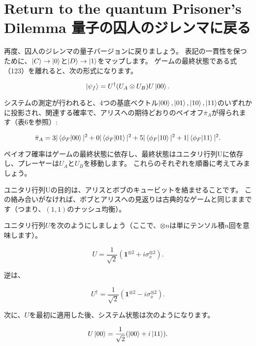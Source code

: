 \section{Return to the quantum Prisoner’s Dilemma 量子の囚人のジレンマに戻る}

再度、囚人のジレンマの量子バージョンに戻りましょう。 表記の一貫性を保つために、$\ket{C} \to \ket{0}$と$\ket{D} \to \ket{1}$をマップします。
ゲームの最終状態である式（123）を離れると、次の形式になります。

\begin{equation}
\label{133}
\ket{\psi_f}
=
U^{\dagger} ( U_A \otimes U_B ) U \ket{00}.
\end{equation}


システムの測定が行われると、4つの基底ベクトル$\ket{00}, \ket{01}, \ket{10}, \ket{11}$のいずれかに投影され、関連する確率で、アリスへの期待どおりのペイオフ$\bar{\pi}_A$が得られます（表6を参照）:

\begin{equation}
\label{134}
\bar{\pi}_A
=
3| \braket{\phi_F | 00} |^2
+0| \braket{\phi_F | 01} |^2
+5| \braket{\phi_F |10 } |^2
+1| \braket{\phi_F |11 } |^2 .
\end{equation}

ペイオフ確率はゲームの最終状態に依存し、最終状態はユニタリ行列Uに依存し、プレーヤーは$U_A$と$U_B$を移動します。 これらのそれぞれを順番に考えてみましょう。

ユニタリ行列Uの目的は、アリスとボブのキュービットを絡ませることです。 この絡み合いがなければ、ボブとアリスへの見返りは古典的なゲームと同じままです（つまり、$(1,1)$のナッシュ均衡）。

ユニタリ行列$U$を次のようにしましょう（ここで、$\otimes n$は単にテンソル積$n$回を意味します）。

\begin{equation}
\label{135}
U
=
\frac{1}{\sqrt{2}}
(\mathbf{1}^{\otimes 2} + i \sigma_x^{\otimes 2}).
\end{equation}

逆は、

\begin{equation}
\label{136}
U^{\dagger}
=
\frac{1}{\sqrt{2}}
(\mathbf{1}^{\otimes 2} - i \sigma_x^{\otimes 2}).
\end{equation}


次に、$U$を最初に適用した後、システム状態は次のようになります。

\begin{equation}
\label{137}
U \ket{00}
=
\frac{1}{\sqrt{2}}
( \ket{00} + i \ket{11}).
\end{equation}



